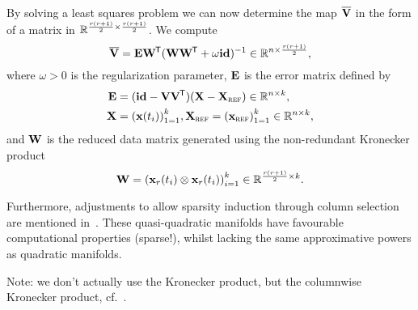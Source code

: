 By solving a least squares problem we can now determine the map $\overline{\mathbf{V}}$ in the form of a matrix in $\mathbb{R}^{\frac{r (r + 1)}{2} \times \frac{r (r + 1)}{2}}$.
We compute
\begin{equation}
    \overline{\mathbf{V}} = \mathbf{E} \mathbf{W}^{\mkern-1.5mu \mathsf{T}} (\mathbf{W} \mathbf{W}^{\mkern-1.5mu \mathsf{T}} + \omega \mathbf{id})^{-1} \in \mathbb{R}^{n \times \frac{r (r + 1)}{2}},
\end{equation}
where $\omega > 0$ is the regularization parameter, $\mathbf{E}$ is the error matrix defined by
\begin{align*}
	\mathbf{E} &= (\mathbf{id} - \mathbf{V} \mathbf{V}^{\mkern-1.5mu \mathsf{T}})(\mathbf{X} - \mathbf{X}_{\textsc{ref}}) \in \mathbb{R}^{n \times k}, \\
    \mathbf{X} &= {\left( \mathbf{x}(t_i) \right)}_{1 = 1}^k, \mathbf{X}_\textsc{ref} = {\left( \mathbf{x}_\textsc{ref} \right)}_{1 = 1}^k \in \mathbb{R}^{n \times k},
\end{align*}
and $\mathbf{W}$ is the reduced data matrix generated using the non-redundant Kronecker product
\[
    \mathbf{W} = {\left( \mathbf{x}_r(t_i) \otimes \mathbf{x}_r(t_i) \right)}_{i = 1}^k \in \mathbb{R}^{\frac{r (r + 1)}{2} \times k}.
\]

Furthermore, adjustments to allow sparsity induction through column selection are mentioned in~\cite[Section~2.3]{Geelen2023}.
These quasi-quadratic manifolds have favourable computational properties (sparse!), whilst lacking the same approximative powers as quadratic manifolds.

Note: we don't actually use the Kronecker product, but the columnwise Kronecker product, cf.~\cite{Favier2021}.